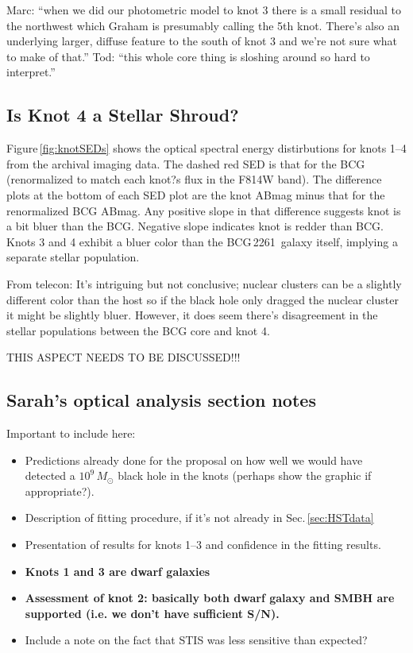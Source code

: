 \documentclass[useAMS,usenatbib]{emulateapj}
\newcommand{\src}{BCG\,2261}
\newcommand{\msun}{M_{\odot}}
\newcommand{\fixme}[1]{{\color{red} #1 }}
\begin{document}
Marc: ``when we did our photometric model to knot 3 there is a small residual to the northwest which Graham is presumably calling the 5th knot. There's also an underlying larger, diffuse feature to the south of knot 3 and we're not sure what to make of that.'' Tod: ``this whole core thing is sloshing around so hard to interpret.''

\subsection{\fixme{Is Knot 4 a Stellar Shroud?}}
Figure\,\ref{fig:knotSEDs} shows the optical spectral energy distirbutions for knots 1--4 from the archival imaging data. The dashed red SED is that for the BCG (renormalized to match each knot?s flux in the F814W band). The difference plots at the bottom of each SED plot are the knot ABmag minus that for the renormalized BCG ABmag. Any positive slope in that difference suggests knot is a bit bluer than the BCG. Negative slope indicates knot is redder than BCG. Knots 3 and 4 exhibit a bluer color than the \src\ galaxy itself, implying a separate stellar population.

From telecon: It's intriguing but not conclusive; nuclear clusters can be a slightly different color than the host so if the black hole only dragged the nuclear cluster it might be slightly bluer. However, it does seem there's disagreement in the stellar populations between the BCG core and knot 4.

\fixme{THIS ASPECT NEEDS TO BE DISCUSSED!!!}

\fixme{\subsection{Sarah's optical analysis section notes}
\noindent Important to include here:
\begin{itemize}
\item Predictions already done for the proposal on how well we would have detected a $10^9\,\msun$ black hole in the knots (perhaps show the graphic if appropriate?).
\item Description of fitting procedure, if it's not already in Sec.\,\ref{sec:HSTdata}
\item Presentation of results for knots 1--3 and confidence in the fitting results.
\item {\bf Knots 1 and 3 are dwarf galaxies}
\item {\bf Assessment of knot 2: basically both dwarf galaxy and SMBH are supported (i.e. we don't have sufficient S/N).}
\item Include a note on the fact that STIS was less sensitive than expected?
\end{itemize}}
\end{document}
